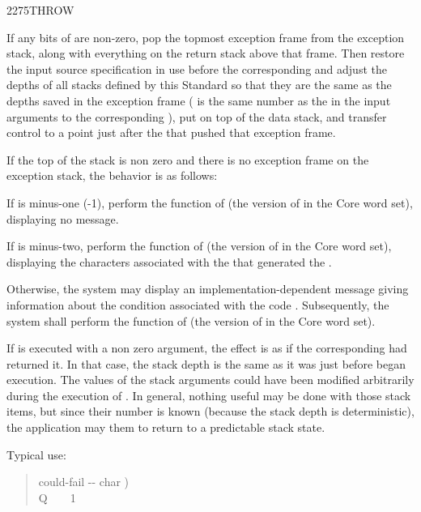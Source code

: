 \begin{worddef}{2275}{THROW}
\item {}

	If any bits of  are non-zero, pop the topmost exception
	frame from the exception stack, along with everything on the
	return stack above that frame. Then restore the input source
	specification in use before the corresponding 
	and adjust the depths of all stacks defined by this Standard
	so that they are the same as the depths saved in the exception
	frame ( is the same number as the  in the input
	arguments to the corresponding ), put  on
	top of the data stack, and transfer control to a point just after
	the  that pushed that exception frame.

	If the top of the stack is non zero and there is no exception
	frame on the exception stack, the behavior is as follows:

	If  is minus-one (-1), perform the function of
	 (the version of  in
	the Core word set), displaying no message.

	If  is minus-two, perform the function of
	 (the version of 
	in the Core word set), displaying the characters 
	associated with the  that generated the
	.

	Otherwise, the system may display an implementation-dependent
	message giving information about the condition associated with
	the  code . Subsequently, the system shall
	perform the function of  (the version
	of  in the Core word set).

	\begin{rationale} %
		If  is executed with a non zero argument, the effect
		is as if the corresponding  had returned it. In that
		case, the stack depth is the same as it was just before 
		began execution. The values of the  stack arguments could
		have been modified arbitrarily during the execution of .
		In general, nothing useful may be done with those stack items, but
		since their number is known (because the stack depth is deterministic),
		the application may  them to return to a predictable
		stack state.

		Typical use:
		\begin{quote}\ttfamily
			\word{:} could-fail  -{}- char ) \\
			\tab {}  \word{[CHAR]} Q \word{=}~
				~ 1 
			\word{;}


\end{quote}
\end{rationale}
\end{worddef}
